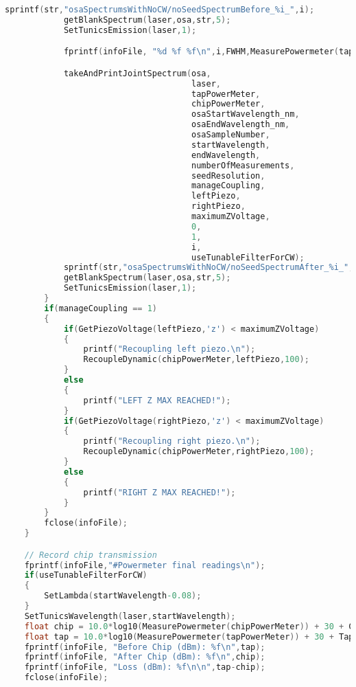 \begin{lstlisting}[style=customc, language=C]
            sprintf(str,"osaSpectrumsWithNoCW/noSeedSpectrumBefore_%i_",i);
            getBlankSpectrum(laser,osa,str,5);
            SetTunicsEmission(laser,1);

            fprintf(infoFile, "%d %f %f\n",i,FWHM,MeasurePowermeter(tapPowerMeter),MeasurePowermeter(chipPowerMeter));

            takeAndPrintJointSpectrum(osa,
                                      laser,
                                      tapPowerMeter,
                                      chipPowerMeter,
                                      osaStartWavelength_nm,
                                      osaEndWavelength_nm,
                                      osaSampleNumber,
                                      startWavelength,
                                      endWavelength,
                                      numberOfMeasurements,
                                      seedResolution,
                                      manageCoupling,
                                      leftPiezo,
                                      rightPiezo,
                                      maximumZVoltage,
                                      0,
                                      1,
                                      i,
                                      useTunableFilterForCW);
            sprintf(str,"osaSpectrumsWithNoCW/noSeedSpectrumAfter_%i_",i);
            getBlankSpectrum(laser,osa,str,5);
            SetTunicsEmission(laser,1);
        }
        if(manageCoupling == 1)
        {
            if(GetPiezoVoltage(leftPiezo,'z') < maximumZVoltage)
            {
                printf("Recoupling left piezo.\n");
                RecoupleDynamic(chipPowerMeter,leftPiezo,100);
            }
            else
            {
                printf("LEFT Z MAX REACHED!");
            }
            if(GetPiezoVoltage(rightPiezo,'z') < maximumZVoltage)
            {
                printf("Recoupling right piezo.\n");
                RecoupleDynamic(chipPowerMeter,rightPiezo,100);
            }
            else
            {
                printf("RIGHT Z MAX REACHED!");
            }
        }
        fclose(infoFile);
    }

    // Record chip transmission
    fprintf(infoFile,"#Powermeter final readings\n");
    if(useTunableFilterForCW)
    {
        SetLambda(startWavelength-0.08);
    }
    SetTunicsWavelength(laser,startWavelength);
    float chip = 10.0*log10(MeasurePowermeter(chipPowerMeter)) + 30 + ChipPowermeterAttenuation;
    float tap = 10.0*log10(MeasurePowermeter(tapPowerMeter)) + 30 + TapPowermeterAttenuation;
    fprintf(infoFile, "Before Chip (dBm): %f\n",tap);
    fprintf(infoFile, "After Chip (dBm): %f\n",chip);
    fprintf(infoFile, "Loss (dBm): %f\n\n",tap-chip);
    fclose(infoFile);



\end{lstlisting}
